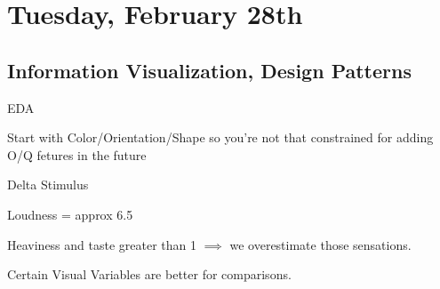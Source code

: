\section{Tuesday, February 28th}
\subsection{Information Visualization, Design Patterns}

EDA

Start with Color/Orientation/Shape so you're not that constrained for adding O/Q fetures in the future

Delta Stimulus

Loudness = approx 6.5

Heaviness and taste greater than 1 $\implies$ we overestimate those sensations.

Certain Visual Variables are better for comparisons.
